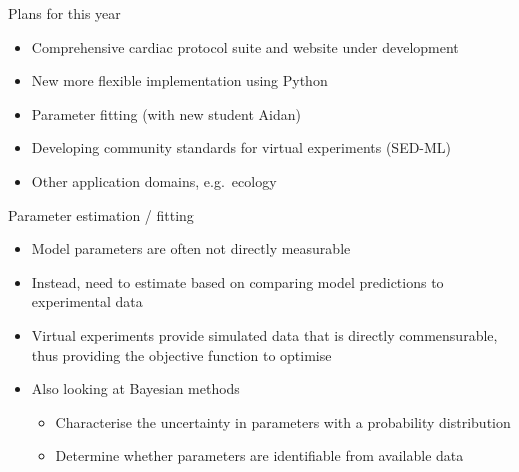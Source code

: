 \documentclass[t,xcolor={usenames,dvipsnames}]{beamer}
\begin{document}
\begin{frame}{Plans for this year}
\begin{itemize}
\item Comprehensive cardiac protocol suite and website under development
\item New more flexible implementation using Python
\item Parameter fitting (with new student Aidan)
\item Developing community standards for virtual experiments (SED-ML)
\item Other application domains, e.g.\ ecology
\end{itemize}
\end{frame}


\begin{frame}{Parameter estimation / fitting}
\begin{itemize}
\item Model parameters are often not directly measurable
\item Instead, need to estimate based on comparing model predictions to experimental data
\item Virtual experiments provide simulated data that is directly commensurable, thus providing the objective function to optimise
\item Also looking at Bayesian methods
  \begin{itemize}
  \item Characterise the uncertainty in parameters with a probability distribution
  \item Determine whether parameters are identifiable from available data
  \end{itemize}
\end{itemize}
\end{frame}
\end{document}
